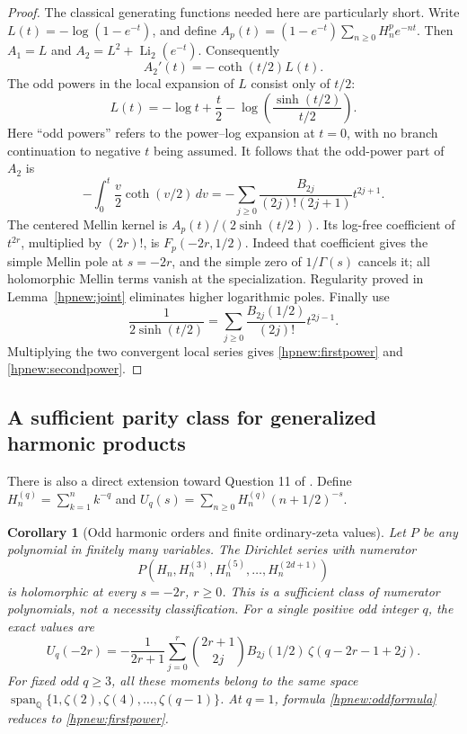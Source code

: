 \documentclass[11pt,a4paper]{article}
\numberwithin{equation}{section}
\newtheorem{corollary}[theorem]{Corollary}
\theoremstyle{definition}
\theoremstyle{remark}
\DeclareMathOperator{\Li}{Li}
\begin{document}
\begin{proof}
The classical generating functions needed here are particularly short.
Write $L(t)=-\log(1-e^{-t})$, and define
$A_p(t)=(1-e^{-t})\sum_{n\ge0}H_n^pe^{-nt}$.
Then $A_1=L$ and $A_2=L^2+\Li_2(e^{-t})$.
Consequently
\[
                         A_2'(t)=-\coth(t/2)L(t).
\]
The odd powers in the local expansion of $L$ consist only of $t/2$:
\[
 L(t)=-\log t+\frac t2
                  -\log\left(\frac{\sinh(t/2)}{t/2}\right).
\]
Here ``odd powers'' refers to the power--log expansion at $t=0$,
with no branch continuation to negative $t$ being assumed.
It follows that the odd-power part of $A_2$ is
\[
 -\int_0^t\frac v2\coth(v/2)\,dv
       =-\sum_{j\ge0}\frac{B_{2j}}{(2j)!(2j+1)}t^{2j+1}.
\]
The centered Mellin kernel is $A_p(t)/(2\sinh(t/2))$.
Its log-free coefficient of $t^{2r}$, multiplied by $(2r)!$, is
$F_p(-2r,1/2)$. Indeed that coefficient gives the simple Mellin
pole at $s=-2r$, and the simple zero of $1/\Gamma(s)$ cancels
it; all holomorphic Mellin terms vanish at the specialization.
Regularity proved in Lemma~\ref{hpnew:joint} eliminates higher
logarithmic poles. Finally use
\[
 \frac1{2\sinh(t/2)}=
             \sum_{j\ge0}\frac{B_{2j}(1/2)}{(2j)!}t^{2j-1}.
\]
Multiplying the two convergent local series gives
\eqref{hpnew:firstpower} and \eqref{hpnew:secondpower}.
\end{proof}

\subsection{A sufficient parity class for generalized harmonic products}

There is also a direct extension toward Question 11 of
\cite{RepoExactResonant}. Define
$H_n^{(q)}=\sum_{k=1}^n k^{-q}$ and
$U_q(s)=\sum_{n\ge0}H_n^{(q)}(n+1/2)^{-s}$.

\begin{corollary}[Odd harmonic orders and finite ordinary-zeta values]
\label{hpnew:oddorders}
Let $P$ be any polynomial in finitely many variables. The Dirichlet
series with numerator
\[
                 P(H_n,H_n^{(3)},H_n^{(5)},\ldots,H_n^{(2d+1)})
\]
is holomorphic at every $s=-2r$, $r\ge0$. This is a sufficient
class of numerator polynomials, not a necessity classification.
For a single positive odd integer $q$, the exact values are
\begin{equation}\label{hpnew:oddformula}
 \boxed{\displaystyle
 U_q(-2r)=-\frac1{2r+1}\sum_{j=0}^{r}\binom{2r+1}{2j}
          B_{2j}(1/2)\,
                         \zeta(q-2r-1+2j).}
\end{equation}
For fixed odd $q\ge3$, all these moments belong to the same space
$\operatorname{span}_{\mathbb Q}\{1,\zeta(2),\zeta(4),\ldots,
\zeta(q-1)\}$. At $q=1$, formula \eqref{hpnew:oddformula} reduces
to \eqref{hpnew:firstpower}.
\end{corollary}
\end{document}
